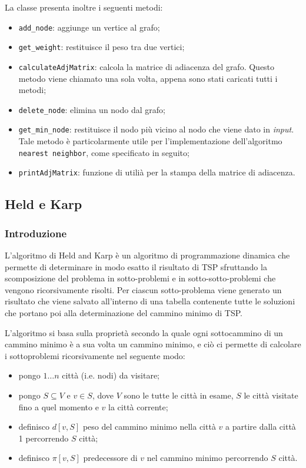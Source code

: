 La classe presenta inoltre i seguenti metodi:
\begin{itemize}
    \item \texttt{add\_node}: aggiunge un vertice al grafo;
    \item \texttt{get\_weight}: restituisce il peso tra due vertici;
    \item \texttt{calculateAdjMatrix}: calcola la matrice di adiacenza del grafo. Questo metodo viene chiamato una sola volta, appena sono stati caricati tutti i metodi;
    \item \texttt{delete\_node}: elimina un nodo dal grafo;
    \item \texttt{get\_min\_node}: restituisce il nodo più vicino al nodo che viene dato in \textit{input}. Tale metodo è particolarmente utile per l'implementazione dell'algoritmo \texttt{nearest neighbor}, come specificato in seguito;
    \item \texttt{printAdjMatrix}: funzione di utilià per la stampa della matrice di adiacenza. 
\end{itemize}

\subsection{Held e Karp}

\subsubsection{Introduzione}

L'algoritmo di Held and Karp è un algoritmo di programmazione dinamica che permette di determinare in modo esatto il risultato di TSP sfruttando la scomposizione del problema in sotto-problemi e in sotto-sotto-problemi che vengono ricorsivamente risolti. Per ciascun sotto-problema viene generato un risultato che viene salvato all'interno di una tabella contenente tutte le soluzioni che portano poi alla determinazione del cammino minimo di TSP.

L'algoritmo si basa sulla proprietà secondo la quale ogni sottocammino di un cammino minimo è a sua volta un cammino minimo, e ciò ci permette di calcolare i sottoproblemi ricorsivamente nel seguente modo: 

\begin{itemize}
    \item  pongo \(1 \dots n\) città (i.e. nodi) da visitare;
    \item  pongo \(S \subseteq V\) e \(v \in S\), dove \(V\) sono le tutte le città in esame, \(S\) le città visitate fino a quel momento e \(v\) la città corrente;

\item definisco \(d[v, S]\) peso del cammino minimo nella città \(v\) a partire dalla città 1 percorrendo \(S\) città;
\item definisco \(\pi[v, S]\) predecessore di \(v\) nel cammino minimo percorrendo \(S\) città.
\end{itemize}


